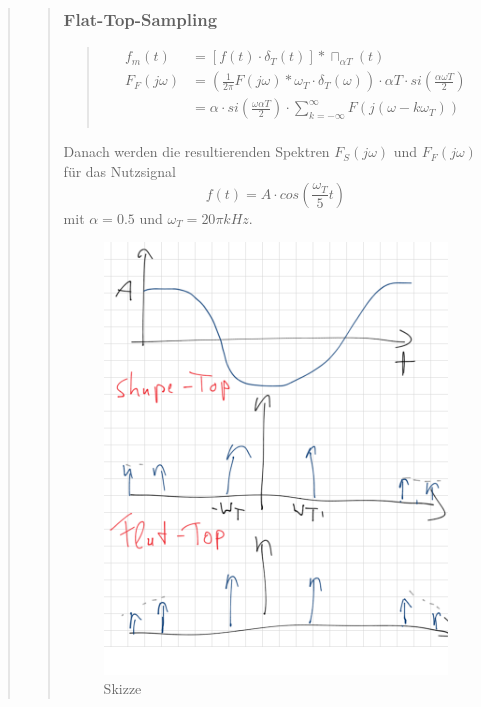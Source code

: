 \begin{quote}
\begin{quote}
        \subsubsection{Flat-Top-Sampling}
		\begin{quote}
			\begin{equation*}
            	\begin{split}
            		f_m (t) &= [f (t) \cdot \delta_T (t)] \ast \sqcap_{\alpha T} (t)\\
            		F_F (j\omega) &= \left ( \frac{1}{2 \pi} F (j\omega) \ast \omega_T
            		\cdot \delta_T (\omega) \right) \cdot \alpha T \cdot si (\frac{\alpha \omega T}{2})\\
            		&= \alpha \cdot si \left( \frac{\omega \alpha T}{2} \right) \cdot \sum_{k=-\infty}^{\infty} F(j(\omega -
            		k\omega_T))\\
            	\end{split}
            \end{equation*}
		\end{quote}
		
		Danach werden die resultierenden Spektren $F_S (j\omega)$ und $F_F (j\omega)$
		für das Nutzsignal
		\begin{equation*}
        f(t) = A \cdot cos(\frac{\omega_T}{5}t)    	
        \end{equation*}
		mit $\alpha = 0.5$ und $\omega_T = 20\pi kHz$.
		
		
		 \begin{figure}[H]
    \centering
        \includegraphics[scale=0.7, trim = 0cm 0cm 0cm 0cm,
        clip]{./Bilder/vorbereitungskizze}
            \caption{Skizze}
  	    \end{figure}
		

\end{quote}
\end{quote}
